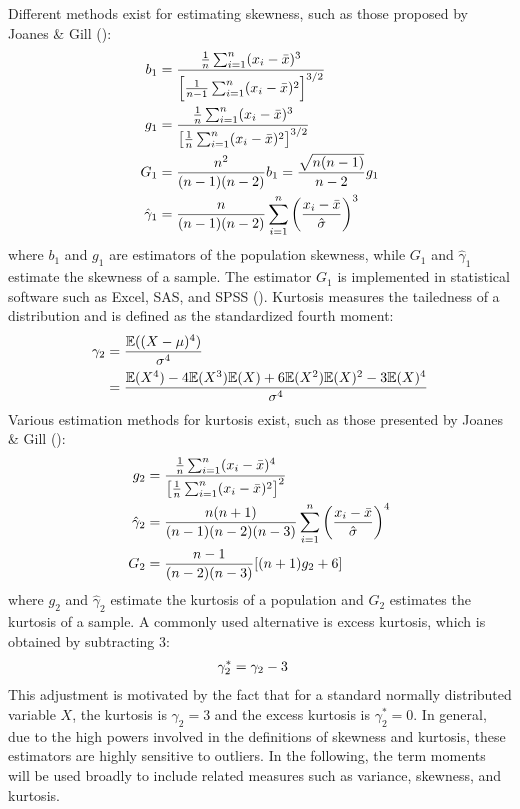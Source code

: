 Different methods exist for estimating skewness, such as those proposed by Joanes \& Gill (\citeyear{joanesComparingMeasuresSample1998}):
\begin{align}
    b_1 &= \frac{\frac{1}{n}\sum_{i=1}^{n}(x_i-\bar{x})^3}{\left[\frac{1}{n-1}\sum_{i=1}^{n}(x_i-\bar{x})^2\right]^{3/2}} \notag \\
    g_1 &= \frac{\frac{1}{n}\sum_{i=1}^{n}(x_i-\bar{x})^3}{\left[\frac{1}{n}\sum_{i=1}^{n}(x_i-\bar{x})^2\right]^{3/2}} \notag \\
    G_1 &= \frac{n^2}{(n-1)(n-2)}b_1 = \frac{\sqrt{n(n-1)}}{n-2}g_1 \notag \\
    \hat{\gamma}_1 &= \frac{n}{(n-1)(n-2)}\sum_{i=1}^n \left(\frac{x_i-\bar{x}}{\hat{\sigma}}\right)^3 \notag
\end{align}
where $b_1$ and $g_1$ are estimators of the population skewness, while $G_1$ and $\hat{\gamma}_1$ estimate the skewness of a sample. The estimator $G_1$ is implemented in statistical software such as Excel, SAS, and SPSS (\cite{doaneMeasuringSkewnessForgotten2011}). Kurtosis measures the tailedness of a distribution and is defined as the standardized fourth moment:
\begin{align}
    \label{eq:definition_kurtosis}
    \gamma_2 &= \frac{\mathbb{E}((X-\mu)^4)}{\sigma^4} \\
    &= \frac{\mathbb{E}(X^4) - 4\mathbb{E}(X^3)\mathbb{E}(X) + 6\mathbb{E}(X^2)\mathbb{E}(X)^2 - 3\mathbb{E}(X)^4}{\sigma^4} \notag
\end{align}
Various estimation methods for kurtosis exist, such as those presented by Joanes \& Gill (\citeyear{joanesComparingMeasuresSample1998}):
\begin{align}
    g_2 &= \frac{\frac{1}{n}\sum_{i=1}^{n}(x_i-\bar{x})^4}{\left[\frac{1}{n}\sum_{i=1}^{n}(x_i-\bar{x})^2\right]^2} \notag \\
    \hat{\gamma}_2 &= \frac{n(n+1)}{(n-1)(n-2)(n-3)}\sum_{i=1}^n \left(\frac{x_i-\bar{x}}{\hat{\sigma}}\right)^4 \notag \\
    G_2 &= \frac{n-1}{(n-2)(n-3)}[(n+1)g_2 + 6] \notag
\end{align}
where $g_2$ and $\hat{\gamma}_2$ estimate the kurtosis of a population and $G_2$ estimates the kurtosis of a sample. A commonly used alternative is excess kurtosis, which is obtained by subtracting 3:
\begin{align}
    \gamma_2^* &= \gamma_2 - 3\notag
\end{align}
This adjustment is motivated by the fact that for a standard normally distributed variable $X$, the kurtosis is $\gamma_2 = 3$ and the excess kurtosis is $\gamma_2^* = 0$. In general, due to the high powers involved in the definitions of skewness and kurtosis, these estimators are highly sensitive to outliers. In the following, the term moments will be used broadly to include related measures such as variance, skewness, and kurtosis.

